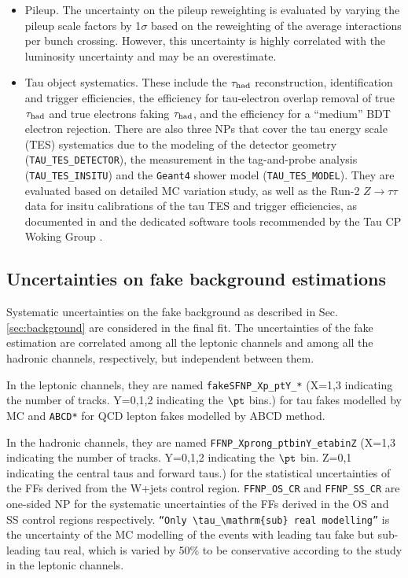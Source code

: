 \begin{itemize}
\item Pileup. The uncertainty on the pileup reweighting is evaluated by varying the pileup scale factors by 1$\sigma$ based on the reweighting of the average interactions per bunch crossing. However, this uncertainty is highly correlated with the luminosity uncertainty and may be an overestimate.
\item Tau object systematics. These include the $\tau_\text{had}$ reconstruction, identification and trigger efficiencies, the efficiency for tau-electron overlap removal of true $\tau_\text{had}$ and true electrons faking $\tau_\text{had}$, and the efficiency for a ``medium'' BDT electron rejection. There are also three NPs that cover the tau energy scale (TES) systematics due to the modeling of the detector geometry (\texttt{TAU\_TES\_DETECTOR}), the measurement in the tag-and-probe analysis (\texttt{TAU\_TES\_INSITU}) and the \texttt{Geant4} shower model (\texttt{TAU\_TES\_MODEL}). They are evaluated based on detailed MC variation study, as well as the Run-2 $Z\to\tau\tau$ data for insitu calibrations of the tau TES and trigger efficiencies, as documented in \cite{tau_sys1} and the dedicated software tools \cite{tau_sys2} recommended by the Tau CP Woking Group \cite{TauCP}.
\end{itemize}

\subsection{Uncertainties on fake background estimations}
\label{sec:syst_datadriven}

Systematic uncertainties on the fake background as described in Sec. \ref{sec:background} are considered in the final fit.
The uncertainties of the fake estimation are correlated among all the leptonic channels and among all the hadronic channels,
respectively, but independent between them.

In the leptonic channels, they are named \texttt{fakeSFNP\_Xp\_ptY\_*} (X=1,3 indicating the number of tracks. Y=0,1,2 indicating the $\pt$ bins.) for tau fakes modelled by MC and \texttt{ABCD*} for QCD lepton fakes modelled by ABCD method.

In the hadronic channels, they are named \texttt{FFNP\_Xprong\_ptbinY\_etabinZ} (X=1,3 indicating the number of tracks. Y=0,1,2 indicating the $\pt$ bin. Z=0,1 indicating the central taus and forward taus.) for the statistical uncertainties of the FFs derived from the W+jets control region. \texttt{FFNP\_OS\_CR} and \texttt{FFNP\_SS\_CR} are one-sided NP for the systematic uncertainties of the FFs derived in the OS and SS control regions respectively. \texttt{``Only $\tau_\mathrm{sub}$ real modelling''} is the uncertainty of the MC modelling of the events with leading tau fake but sub-leading tau real, which is varied by 50\% to be conservative according to the study in the leptonic channels.


